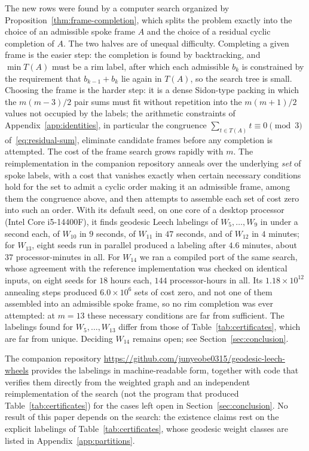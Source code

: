 \documentclass[11pt]{article}
\theoremstyle{definition}
\theoremstyle{remark}
\numberwithin{equation}{section}
\begin{document}
The new rows were found by a computer search organized by
Proposition~\ref{thm:frame-completion}, which splits the problem exactly into the
choice of an admissible spoke frame $A$ and the choice of a residual cyclic
completion of $A$. The two halves are of unequal difficulty. Completing a given
frame is the easier step: the completion is found by backtracking, and
$\min T(A)$ must be a rim label, after which each admissible $b_k$ is
constrained by the requirement that $b_{k-1}+b_k$ lie again in $T(A)$, so
the search tree is small. Choosing the frame is the harder step: it is a
dense Sidon-type packing in which the $m(m-3)/2$ pair sums must fit without
repetition into the $m(m+1)/2$ values not occupied by the labels; the arithmetic
constraints of Appendix~\ref{app:identities}, in particular the congruence
$\sum_{t\in T(A)}t\equiv0\pmod 3$ of~\eqref{eq:residual-sum}, eliminate candidate
frames before any completion is attempted. The cost of the frame search grows
rapidly with $m$. The reimplementation in the companion repository anneals over
the underlying \emph{set} of spoke labels, with a cost that vanishes exactly
when certain necessary conditions hold for the set to admit a cyclic order
making it an admissible frame, among them the congruence above, and then
attempts to assemble each set of cost zero into such an order. With its default
seed, on one core of a desktop processor (Intel Core i5-14400F), it finds
geodesic Leech labelings of $W_5,\ldots,W_9$ in under a second each, of
$W_{10}$ in $9$ seconds, of $W_{11}$ in $47$ seconds, and of $W_{12}$ in $4$
minutes; for $W_{13}$, eight seeds run in parallel produced a labeling after
$4.6$ minutes, about $37$ processor-minutes in all. For $W_{14}$ we ran a
compiled port of the same search, whose agreement with the reference
implementation was checked on identical inputs, on eight seeds for $18$ hours
each, $144$ processor-hours in all. Its $1.18\times10^{12}$ annealing steps
produced $6.0\times10^{6}$ sets of cost zero, and not one of them assembled
into an admissible spoke frame, so no rim completion was ever attempted: at
$m=13$ these necessary conditions are far from sufficient. The labelings found
for $W_5,\ldots,W_{13}$ differ from those of Table~\ref{tab:certificates},
which are far from unique. Deciding $W_{14}$ remains open; see Section~\ref{sec:conclusion}.

The companion repository \url{https://github.com/junyeobe0315/geodesic-leech-wheels}
provides the labelings in machine-readable form, together with code that
verifies them directly from the weighted graph and an independent
reimplementation of the search (not the program that produced
Table~\ref{tab:certificates}) for the cases left open in
Section~\ref{sec:conclusion}. No result of this paper depends on the search: the
existence claims rest on the explicit labelings of Table~\ref{tab:certificates},
whose geodesic weight classes are listed in Appendix~\ref{app:partitions}.
\end{document}
